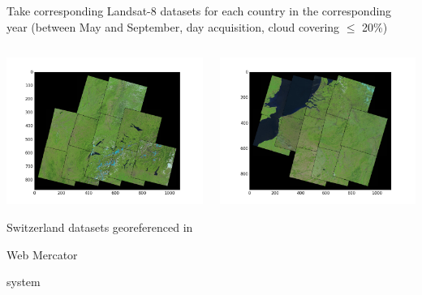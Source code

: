 \documentclass[c]{beamer}
\begin{document}
\begin{frame}
\begin{itemize}
{ \item Take corresponding Landsat-8 datasets for each country in the corresponding year (between May and September, day acquisition, cloud covering $\leq$ 20\%)
 \begin{columns}
  \begin{column}{0.33\textwidth}
  \begin{overlayarea}{\linewidth}{3cm}
    \centering\vfill
    \includegraphics[scale=0.20]{../../data/Suisse/covering-selection.png}
  \end{overlayarea}
  \begin{overlayarea}{\linewidth}{1cm}
    \centering
    \tiny Switzerland datasets georeferenced in \begin{itshape}Web Mercator\end{itshape} system\par
  \end{overlayarea}
  \end{column}
  \begin{column}{0.33\textwidth}
   \begin{overlayarea}{\linewidth}{3cm}
    \centering\vfill
    \includegraphics[scale=0.20]{../../data/Belgique/covering-selection.png}

\end{overlayarea}
\end{column}
\end{columns}}
\end{itemize}
\end{frame}
\end{document}

